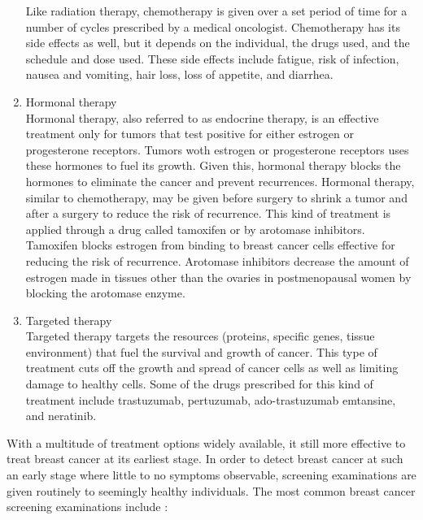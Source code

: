 \begin{enumerate}
	Like radiation therapy, chemotherapy is given over a set period of time for a number of cycles prescribed by a medical oncologist. Chemotherapy has its side effects as well, but it depends on the individual, the drugs used, and the schedule and dose used. These side effects include fatigue, risk of infection, nausea and vomiting, hair loss, loss of appetite, and diarrhea.

	\item Hormonal therapy \\
	Hormonal therapy, also referred to as endocrine therapy, is an effective treatment only for tumors that test positive for either estrogen or progesterone receptors. Tumors woth estrogen or progesterone receptors uses these hormones to fuel its growth. Given this, hormonal therapy blocks the hormones to eliminate the cancer and prevent recurrences. Hormonal therapy, similar to chemotherapy, may be given before surgery to shrink a tumor and after a surgery to reduce the risk of recurrence. This kind of treatment is applied through a drug called tamoxifen or by arotomase inhibitors. Tamoxifen blocks estrogen from binding to breast cancer cells effective for reducing the risk of recurrence. Arotomase inhibitors decrease the amount of estrogen made in tissues other than the ovaries in postmenopausal women by blocking the arotomase enzyme.

	\item Targeted therapy \\
	Targeted therapy targets the resources (proteins, specific genes, tissue environment) that fuel the survival and growth of cancer. This type of treatment cuts off the growth and spread of cancer cells as well as limiting damage to healthy cells. Some of the drugs prescribed for this kind of treatment include trastuzumab, pertuzumab, ado-trastuzumab emtansine, and neratinib.
	
\end{enumerate}

	With a multitude of treatment options widely available, it still more effective to treat breast cancer at its earliest stage. In order to detect breast cancer at such an early stage where little to no symptoms observable, screening examinations are given routinely to seemingly healthy individuals. The most common breast cancer screening examinations include \cite{breastScreening}:

